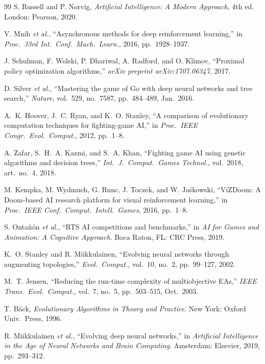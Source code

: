 \documentclass[conference]{IEEEtran}
\begin{document}
\begin{thebibliography}{99}
S. Russell and P. Norvig, \emph{Artificial Intelligence: A Modern Approach}, 4th ed. London: Pearson, 2020.

V. Mnih \emph{et al.}, ``Asynchronous methods for deep reinforcement learning,'' in \emph{Proc.\ 33rd Int.\ Conf.\ Mach.\ Learn.}, 2016, pp.~1928--1937.

J. Schulman, F. Wolski, P. Dhariwal, A. Radford, and O. Klimov, ``Proximal policy optimization algorithms,'' \emph{arXiv preprint arXiv:1707.06347}, 2017.

D. Silver \emph{et al.}, ``Mastering the game of Go with deep neural networks and tree search,'' \emph{Nature}, vol.~529, no.~7587, pp.~484--489, Jan.\ 2016.

A.~K. Hoover, J.~C. Ryan, and K.~O. Stanley, ``A comparison of evolutionary computation techniques for fighting-game AI,'' in \emph{Proc.\ IEEE Congr.\ Evol.\ Comput.}, 2012, pp.~1--8.

A. Zafar, S.~H.~A. Kazmi, and S.~A. Khan, ``Fighting game AI using genetic algorithms and decision trees,'' \emph{Int.\ J.\ Comput.\ Games Technol.}, vol.~2018, art.\ no.~4, 2018.

M. Kempka, M. Wydmuch, G. Runc, J. Toczek, and W. Ja\'skowski, ``ViZDoom: A Doom-based AI research platform for visual reinforcement learning,'' in \emph{Proc.\ IEEE Conf.\ Comput.\ Intell.\ Games}, 2016, pp.~1--8.

S. Onta\~n\'on \emph{et al.}, ``RTS AI competitions and benchmarks,'' in \emph{AI for Games and Animation: A Cognitive Approach}. Boca Raton, FL: CRC Press, 2019.

K.~O. Stanley and R. Miikkulainen, ``Evolving neural networks through augmenting topologies,'' \emph{Evol.\ Comput.}, vol.~10, no.~2, pp.~99--127, 2002.

M.~T. Jensen, ``Reducing the run-time complexity of multiobjective EAs,'' \emph{IEEE Trans.\ Evol.\ Comput.}, vol.~7, no.~5, pp.~503--515, Oct.\ 2003.

T. B\"ack, \emph{Evolutionary Algorithms in Theory and Practice}. New York: Oxford Univ.\ Press, 1996.

R. Miikkulainen \emph{et al.}, ``Evolving deep neural networks,'' in \emph{Artificial Intelligence in the Age of Neural Networks and Brain Computing}. Amsterdam: Elsevier, 2019, pp.~293--312.


\end{thebibliography}
\end{document}
